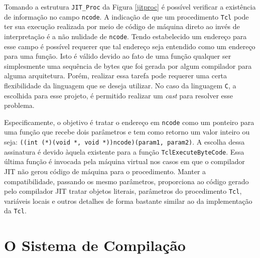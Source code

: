 Tomando a estrutura \verb!JIT_Proc! da Figura \ref{jitproc}
é possível verificar a existência de informação no campo \verb!ncode!.
A indicação de que um
procedimento \texttt{Tcl} pode ter sua execução realizada por meio de
código de máquina direto ao invés de interpretação é a não nulidade de
\verb!ncode!. Tendo estabelecido um endereço para esse campo é %
possível requerer que tal endereço seja entendido como um endereço para
uma função.%
Isto é válido devido ao fato de uma função qualquer ser
simplesmente uma sequência de bytes que foi gerada por algum
compilador para alguma arquitetura. Porém, realizar essa tarefa %
pode
requerer uma certa flexibilidade da linguagem que se deseja
utilizar. No caso da linguagem \texttt{C}, a escolhida para
esse projeto, é permitido realizar um \textit{cast} para %
resolver esse problema.

Especificamente, o objetivo é tratar o endereço em
\verb!ncode! como um ponteiro para uma função que recebe dois
parâmetros e tem como retorno um valor inteiro%
ou seja:
\verb!((int (*)(void *, void *))ncode)(param1, param2)!. A escolha
dessa assinatura é devido àquela existente para a função
\verb!TclExecuteByteCode!. Essa última função é invocada
pela máquina virtual nos casos em que o compilador
JIT não gerou código de máquina para o procedimento. Manter a
compatibilidade, passando os mesmo
parâmetros, proporciona ao código gerado pelo compilador JIT tratar
objetos literais, parâmetros do procedimento \texttt{Tcl}, variáveis
locais e outros detalhes de forma bastante similar ao da
implementação da \texttt{Tcl}.


\section{O Sistema de Compilação}
\label{sistemacompilacao}

